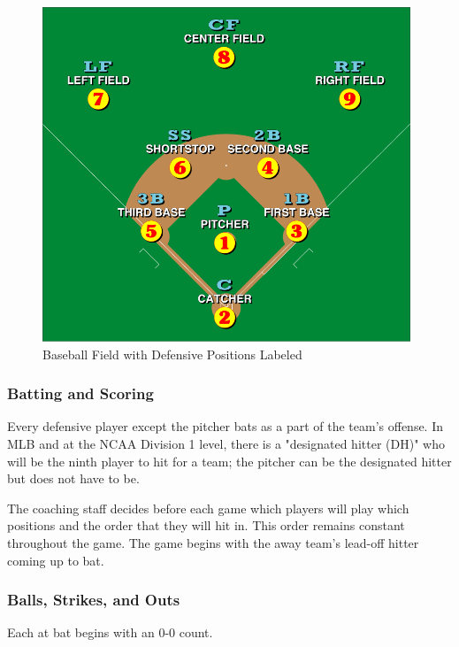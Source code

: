 \documentclass{article}
\begin{document}
\begin{figure}[h]
    \centering        
    \includegraphics[height=10cm]{images/Baseball_positions.svg.png}
    \caption{Baseball Field with Defensive Positions Labeled}
\end{figure}
\vspace{3cm}
\newpage

\subsubsection{Batting and Scoring} 
Every defensive player except the pitcher bats as a part of the team's offense. In MLB and at the NCAA Division 1 level, there is a "designated hitter (DH)" who will be the ninth player to hit for a team; the pitcher can be the designated hitter but does not have to be. 

The coaching staff decides before each game which players will play which positions and the order that they will hit in. This order remains constant throughout the game. The game begins with the away team's lead-off hitter coming up to bat. 

\subsubsection{Balls, Strikes, and Outs} 
Each at bat begins with an 0-0 count. 
\end{document}
